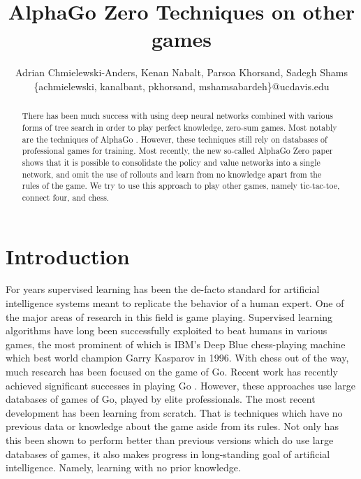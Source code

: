 \documentclass[12pt]{IEEEtran}
\begin{document}
\title{AlphaGo Zero Techniques on other games}

\author{
Adrian Chmielewski-Anders, Kenan Nabalt, Parsoa Khorsand, Sadegh Shams \\
\{achmielewski, kanalbant, pkhorsand, mshamsabardeh\}@ucdavis.edu
}

\maketitle

\begin{abstract}

There has been much success with using deep neural networks combined
with various forms of tree search in order to play perfect knowledge, zero-sum
games. Most notably are the techniques of AlphaGo \cite{AlphaGo}. However,
these techniques still rely on databases of professional games for training.
Most recently, the new so-called AlphaGo Zero paper \cite{AlphaGoZero} shows
that it is possible to consolidate the policy and value networks into a single
network, and omit the use of rollouts and learn from no knowledge
apart from the rules of the game. We try to use this approach to play
other games, namely tic-tac-toe, connect four, and chess.  

\end{abstract}

\section{Introduction}

For years supervised learning has been the de-facto standard for artificial intelligence systems meant to replicate the behavior of a human expert. One of the major areas of research in this field is game playing. Supervised learning algorithms have long been successfully exploited to beat humans in various games, the most prominent of which is IBM's Deep Blue chess-playing machine which best world champion Garry Kasparov in 1996. With chess out of the way, much research has been focused on the game of Go. Recent work has recently achieved significant successes in playing Go \cite{AphaGo}. However, these approaches use large databases of games of Go, played by elite professionals. The most recent development has been learning from scratch. That is techniques which have no previous data or knowledge about the game aside from its rules. Not only has this been shown to perform better than previous versions which do use large databases of games, it also makes progress in long-standing goal of artificial intelligence. Namely, learning with no prior knowledge. 
\end{document}
